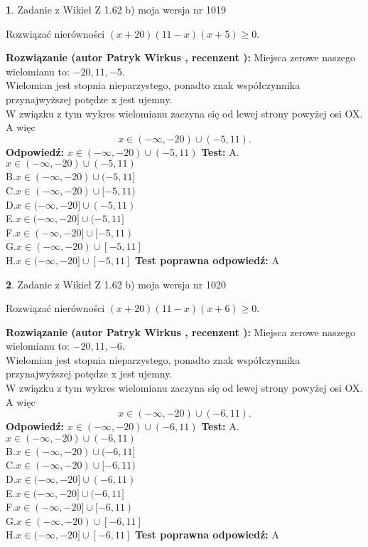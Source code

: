 \documentclass[12pt, a4paper]{article}
\theoremstyle{definition} %
\newtheorem{zad}{}
\newcommand{\zadStart}[1]{\begin{zad}#1\newline}
\newcommand{\zadStop}{\end{zad}}
\newcommand{\rozwStart}[2]{\noindent \textbf{Rozwiązanie (autor #1 , recenzent #2): }\newline}
\newcommand{\rozwStop}{\newline}
\newcommand{\odpStart}{\noindent \textbf{Odpowiedź:}\newline}
\newcommand{\odpStop}{\newline}
\newcommand{\testStart}{\noindent \textbf{Test:}\newline}
\newcommand{\testStop}{\newline}
\newcommand{\kluczStart}{\noindent \textbf{Test poprawna odpowiedź:}\newline}
\newcommand{\kluczStop}{\newline}
\begin{document}
\zadStart{Zadanie z Wikieł Z 1.62 b) moja wersja nr 1019}

Rozwiązać nierówności $(x+20)(11-x)(x+5)\ge0$.
\zadStop
\rozwStart{Patryk Wirkus}{}
Miejsca zerowe naszego wielomianu to: $-20, 11, -5$.\\
Wielomian jest stopnia nieparzystego, ponadto znak współczynnika przy\linebreak najwyższej potędze x jest ujemny.\\ W związku z tym wykres wielomianu zaczyna się od lewej strony powyżej osi OX. A więc $$x \in (-\infty,-20) \cup (-5,11).$$
\rozwStop
\odpStart
$x \in (-\infty,-20) \cup (-5,11)$
\odpStop
\testStart
A.$x \in (-\infty,-20) \cup (-5,11)$\\
B.$x \in (-\infty,-20) \cup (-5,11]$\\
C.$x \in (-\infty,-20) \cup [-5,11)$\\
D.$x \in (-\infty,-20] \cup (-5,11)$\\
E.$x \in (-\infty,-20] \cup (-5,11]$\\
F.$x \in (-\infty,-20] \cup [-5,11)$\\
G.$x \in (-\infty,-20) \cup [-5,11]$\\
H.$x \in (-\infty,-20] \cup [-5,11]$
\testStop
\kluczStart
A
\kluczStop



\zadStart{Zadanie z Wikieł Z 1.62 b) moja wersja nr 1020}

Rozwiązać nierówności $(x+20)(11-x)(x+6)\ge0$.
\zadStop
\rozwStart{Patryk Wirkus}{}
Miejsca zerowe naszego wielomianu to: $-20, 11, -6$.\\
Wielomian jest stopnia nieparzystego, ponadto znak współczynnika przy\linebreak najwyższej potędze x jest ujemny.\\ W związku z tym wykres wielomianu zaczyna się od lewej strony powyżej osi OX. A więc $$x \in (-\infty,-20) \cup (-6,11).$$
\rozwStop
\odpStart
$x \in (-\infty,-20) \cup (-6,11)$
\odpStop
\testStart
A.$x \in (-\infty,-20) \cup (-6,11)$\\
B.$x \in (-\infty,-20) \cup (-6,11]$\\
C.$x \in (-\infty,-20) \cup [-6,11)$\\
D.$x \in (-\infty,-20] \cup (-6,11)$\\
E.$x \in (-\infty,-20] \cup (-6,11]$\\
F.$x \in (-\infty,-20] \cup [-6,11)$\\
G.$x \in (-\infty,-20) \cup [-6,11]$\\
H.$x \in (-\infty,-20] \cup [-6,11]$
\testStop
\kluczStart
A
\kluczStop
\end{document}
